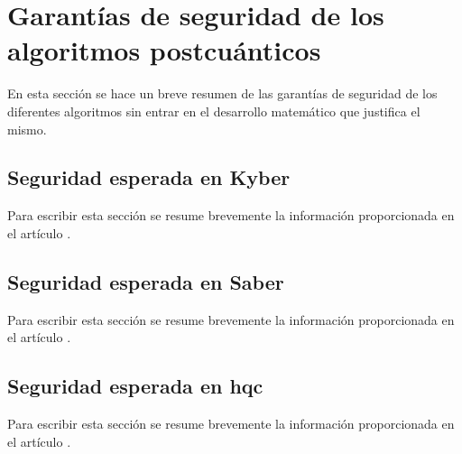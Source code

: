 \section{Garantías de seguridad de los algoritmos postcuánticos}
En esta sección se hace un breve resumen de las garantías de seguridad de los diferentes algoritmos sin entrar en el desarrollo matemático que justifica el mismo.
\subsection{Seguridad esperada en Kyber}
Para escribir esta sección se resume brevemente la información proporcionada en el artículo \cite{kyber-spec-2021}.
\subsection{Seguridad esperada en Saber}
Para escribir esta sección se resume brevemente la información proporcionada en el artículo \cite{saber-spec-2020}.
\subsection{Seguridad esperada en \acrshort{hqc}}
Para escribir esta sección se resume brevemente la información proporcionada en el artículo \cite{hqc2025}.

